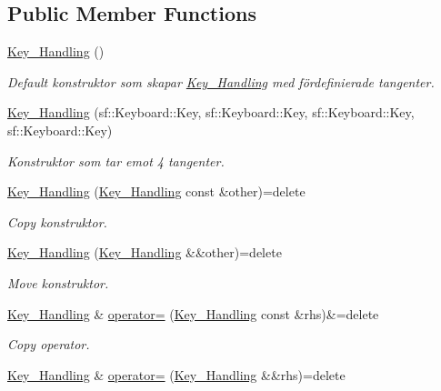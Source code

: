 \subsection*{Public Member Functions}
\begin{DoxyCompactItemize}
\item 
\hyperlink{classKey__Handling_ad39f9645a4c3b4a91c9116e96afd55d8}{Key\+\_\+\+Handling} ()
\begin{DoxyCompactList}\small\item\em Default konstruktor som skapar \hyperlink{classKey__Handling}{Key\+\_\+\+Handling} med fördefinierade tangenter. \end{DoxyCompactList}\item 
\hyperlink{classKey__Handling_a8fc595ca2ab4cf2c542ca36fd1d34b15}{Key\+\_\+\+Handling} (sf\+::\+Keyboard\+::\+Key, sf\+::\+Keyboard\+::\+Key, sf\+::\+Keyboard\+::\+Key, sf\+::\+Keyboard\+::\+Key)
\begin{DoxyCompactList}\small\item\em Konstruktor som tar emot 4 tangenter. \end{DoxyCompactList}\item 
\hyperlink{classKey__Handling_a77ab751460e13501b55aa602195fd164}{Key\+\_\+\+Handling} (\hyperlink{classKey__Handling}{Key\+\_\+\+Handling} const \&other)=delete
\begin{DoxyCompactList}\small\item\em Copy konstruktor. \end{DoxyCompactList}\item 
\hyperlink{classKey__Handling_afcba70ccd67070d27370c808bf14f26b}{Key\+\_\+\+Handling} (\hyperlink{classKey__Handling}{Key\+\_\+\+Handling} \&\&other)=delete
\begin{DoxyCompactList}\small\item\em Move konstruktor. \end{DoxyCompactList}\item 
\hyperlink{classKey__Handling}{Key\+\_\+\+Handling} \& \hyperlink{classKey__Handling_aa8c89a0450a74fc1888089d568c2e87f}{operator=} (\hyperlink{classKey__Handling}{Key\+\_\+\+Handling} const \&rhs)\&=delete
\begin{DoxyCompactList}\small\item\em Copy operator. \end{DoxyCompactList}\item 
\hyperlink{classKey__Handling}{Key\+\_\+\+Handling} \& \hyperlink{classKey__Handling_a095581108c0abb43b0f6c9a67cc62f54}{operator=} (\hyperlink{classKey__Handling}{Key\+\_\+\+Handling} \&\&rhs)=delete

\end{DoxyCompactItemize}
